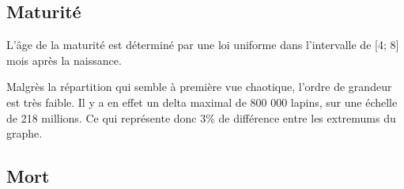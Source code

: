 \documentclass[11)pt,a4paper]{article}
\begin{document}
    \subsection{Maturité}
        L'âge de la maturité est déterminé par une loi uniforme dans l'intervalle de [4; 8] mois après la naissance.
        \begin{center}
        \end{center}
        Malgrès la répartition qui semble à première vue chaotique, l'ordre de grandeur est très faible. Il y a en effet un delta maximal de 800 000 lapins,
         sur une échelle de 218 millions. Ce qui représente donc 3\% de différence entre les extremums du graphe.
    \subsection{Mort}
\end{document}
